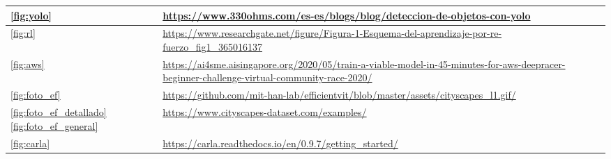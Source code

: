 \begin{appendices}
\begin{tabular}{ | m{4cm} | m{10cm}| m{1cm} | }
	\ref{fig:yolo} & \url{https://www.330ohms.com/es-es/blogs/blog/deteccion-de-objetos-con-yolo} \\
	\hline
	\ref{fig:rl} & \url{https://www.researchgate.net/figure/Figura-1-Esquema-del-aprendizaje-por-re-fuerzo_fig1_365016137} \\
	\hline
	\ref{fig:aws} & \url{https://ai4sme.aisingapore.org/2020/05/train-a-viable-model-in-45-minutes-for-aws-deepracer-beginner-challenge-virtual-community-race-2020/} \\
		\hline
	\ref{fig:foto_ef} & \url{https://github.com/mit-han-lab/efficientvit/blob/master/assets/cityscapes_l1.gif/} \\
	\hline
	\ref{fig:foto_ef_detallado} \ref{fig:foto_ef_general} & \url{https://www.cityscapes-dataset.com/examples/} \\
	\hline
	\ref{fig:carla} & \url{https://carla.readthedocs.io/en/0.9.7/getting_started/} \\
	\hline
\end{tabular}

\end{appendices}




